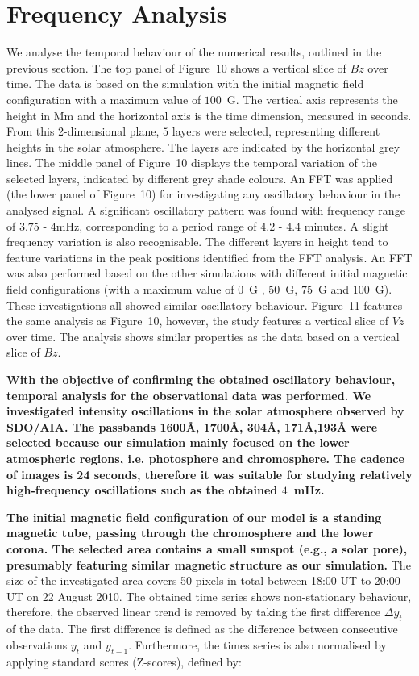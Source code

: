 \documentclass[physics,article,submit,pdftex,moreauthors]{Definitions/mdpi}
\begin{document}
\section{Frequency Analysis}

 We analyse the temporal behaviour of the numerical results, outlined in the previous section. The top panel of Figure~10 shows a vertical slice of $Bz$ over time.  The data is based on the simulation with the initial magnetic field configuration with a maximum value of $100$~G. The vertical axis represents the height in Mm and the horizontal axis is the time dimension, measured in seconds. From this 2-dimensional plane, $5$ layers were selected, representing different heights in the solar atmosphere. The layers are indicated by the horizontal grey lines.   The middle panel of Figure~10 displays the temporal variation of the selected layers, indicated by different grey shade colours. An FFT was applied (the lower panel of Figure~10) for investigating any oscillatory behaviour in the analysed signal. A significant oscillatory pattern was found with frequency range of $3.75$ - $4$mHz, corresponding to a period range of $4.2$ - $4.4$ minutes. A slight frequency variation is also recognisable. The different layers in height tend to feature variations in the peak positions identified from the FFT analysis. An FFT was also performed based on the other simulations with different initial magnetic field configurations (with a maximum value of $0$~G , $50$~G,  $75$~G  and $100$~G). These investigations all showed similar oscillatory behaviour.  Figure~11 features the same analysis as Figure~10, however, the study features a vertical slice of $Vz$ over time. The analysis shows similar properties as the data based on a vertical slice of $Bz$.

{\bf With the objective of confirming the obtained oscillatory behaviour, temporal analysis for the observational data was performed. We investigated intensity oscillations in the solar atmosphere observed by SDO/AIA. The passbands 1600{\AA}, 1700{\AA}, 304{\AA}, 171{\AA},193{\AA} were selected because our simulation mainly focused on the lower atmospheric regions, i.e. photosphere and chromosphere. The cadence of images is 24 seconds, therefore it was suitable for studying relatively high-frequency oscillations such as the obtained $4$~mHz.}

{\bf The initial magnetic field configuration of our model is a standing magnetic tube, passing through the chromosphere and the lower corona. The selected area contains a small sunspot (e.g., a solar pore), presumably featuring similar magnetic structure as our simulation.} The size of the investigated area covers 50 pixels in total between 18:00 UT to 20:00 UT on 22 August 2010. The obtained time series shows non-stationary behaviour, therefore, the observed linear trend is removed by taking the first difference $\Delta  y_{t}$ of the data. The first difference is defined as the difference between consecutive observations $y_{t}$ and $y_{t-1}$. Furthermore, the times series is also normalised by applying standard scores (Z-scores), defined by:
\end{document}
